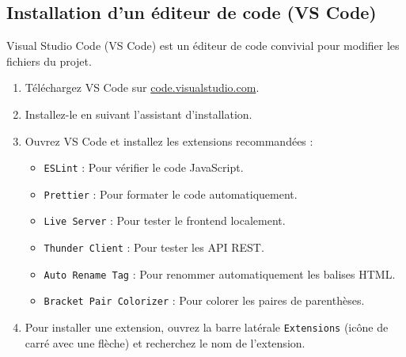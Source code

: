 \documentclass[12pt, a4paper]{article}
\begin{document}
\subsection{Installation d'un éditeur de code (VS Code)}
\begin{stepbox}
Visual Studio Code (VS Code) est un éditeur de code convivial pour modifier les fichiers du projet.

\begin{enumerate}
  \item Téléchargez VS Code sur \href{https://code.visualstudio.com/}{code.visualstudio.com}.
  \item Installez-le en suivant l'assistant d'installation.
  \item Ouvrez VS Code et installez les extensions recommandées :
  \begin{itemize}
    \item \texttt{ESLint} : Pour vérifier le code JavaScript.
    \item \texttt{Prettier} : Pour formater le code automatiquement.
    \item \texttt{Live Server} : Pour tester le frontend localement.
    \item \texttt{Thunder Client} : Pour tester les API REST.
    \item \texttt{Auto Rename Tag} : Pour renommer automatiquement les balises HTML.
    \item \texttt{Bracket Pair Colorizer} : Pour colorer les paires de parenthèses.
  \end{itemize}
  \item Pour installer une extension, ouvrez la barre latérale \texttt{Extensions} (icône de carré avec une flèche) et recherchez le nom de l'extension.
\end{enumerate}
\end{stepbox}
\end{document}
